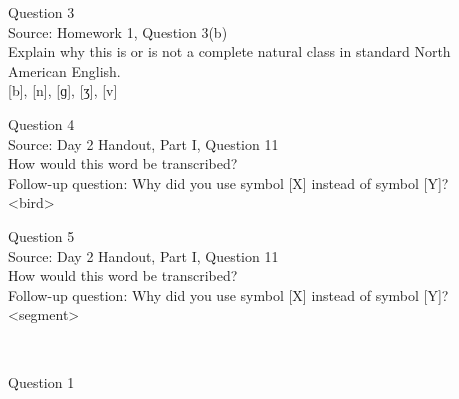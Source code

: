 \documentclass[12pt]{article}
\begin{document}
\newpage

{\large Question 3}\\

Source: Homework 1, Question 3(b)\\

Explain why this is or is not a complete natural class in standard North American English.\\

{[b]}, {[n]}, {[ɡ]}, {[ʒ]}, {[v]}


\newpage

{\large Question 4}\\

Source: Day 2 Handout, Part I, Question 11\\

How would this word be transcribed?\\ Follow-up question: Why did you use symbol [X] instead of symbol [Y]?\\

<bird>


\newpage

{\large Question 5}\\

Source: Day 2 Handout, Part I, Question 11\\

How would this word be transcribed?\\ Follow-up question: Why did you use symbol [X] instead of symbol [Y]?\\

<segment>


\newpage

\begin{center}
\textbf{{\color{red}{\HUGE END OF EXAM}}}\\

\end{center}
\newpage

\begin{center}
\textbf{{\color{blue}{\HUGE START OF EXAM\\}}}

\textbf{{\color{blue}{\HUGE Student ID: 3737\\}}}

\textbf{{\color{blue}{\HUGE 12:45 - 1:00 PM\\}}}

\end{center}
\newpage

{\large Question 1}\\
\end{document}
